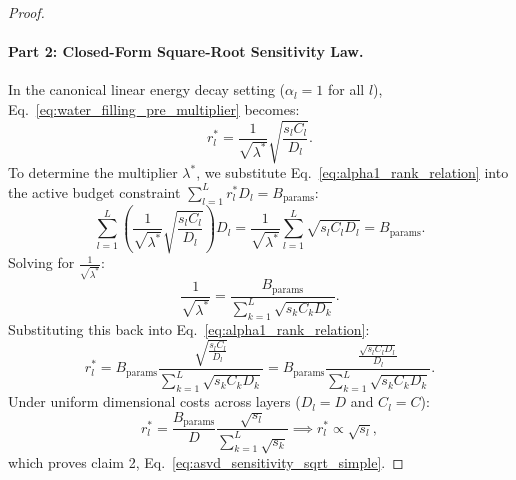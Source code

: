 \begin{proof}
\paragraph{Part 2: Closed-Form Square-Root Sensitivity Law.}
In the canonical linear energy decay setting ($\alpha_l = 1$ for all $l$), Eq.~\eqref{eq:water_filling_pre_multiplier} becomes:
\begin{equation}
r_l^* = \frac{1}{\sqrt{\lambda^*}} \sqrt{\frac{s_l C_l}{D_l}}.
\label{app:eq:alpha1_rank_relation}
\end{equation}
To determine the multiplier $\lambda^*$, we substitute Eq.~\eqref{eq:alpha1_rank_relation} into the active budget constraint $\sum_{l=1}^L r_l^* D_l = B_{\text{params}}$:
\begin{equation}
\sum_{l=1}^L \left( \frac{1}{\sqrt{\lambda^*}} \sqrt{\frac{s_l C_l}{D_l}} \right) D_l = \frac{1}{\sqrt{\lambda^*}} \sum_{l=1}^L \sqrt{s_l C_l D_l} = B_{\text{params}}.
\end{equation}
Solving for $\frac{1}{\sqrt{\lambda^*}}$:
\begin{equation}
\frac{1}{\sqrt{\lambda^*}} = \frac{B_{\text{params}}}{\sum_{k=1}^L \sqrt{s_k C_k D_k}}.
\end{equation}
Substituting this back into Eq.~\eqref{eq:alpha1_rank_relation}:
\begin{equation}
r_l^* = B_{\text{params}} \frac{\sqrt{\frac{s_l C_l}{D_l}}}{\sum_{k=1}^L \sqrt{s_k C_k D_k}} = B_{\text{params}} \frac{\frac{\sqrt{s_l C_l D_l}}{D_l}}{\sum_{k=1}^L \sqrt{s_k C_k D_k}}.
\end{equation}
Under uniform dimensional costs across layers ($D_l = D$ and $C_l = C$):
\begin{equation}
r_l^* = \frac{B_{\text{params}}}{D} \frac{\sqrt{s_l}}{\sum_{k=1}^L \sqrt{s_k}} \implies r_l^* \propto \sqrt{s_l},
\end{equation}
which proves claim 2, Eq.~\eqref{eq:asvd_sensitivity_sqrt_simple}.


\end{proof}
